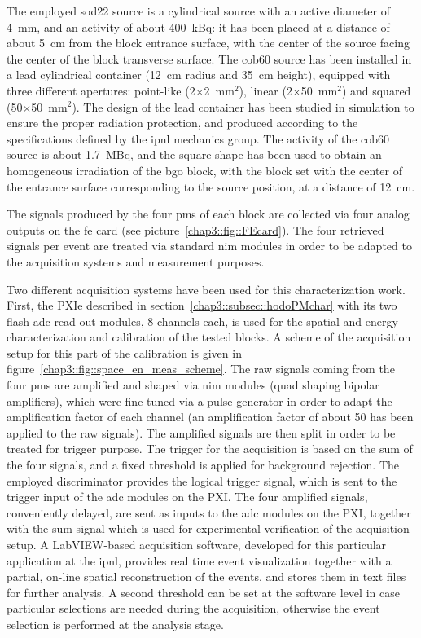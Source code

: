 The employed \gls{sod22} source is a cylindrical source with an active diameter of 4~mm, and an activity of about 400~kBq: it has been placed at a distance of about 5~cm from the block entrance surface, with the center of the source facing the center of the block transverse surface. The \gls{cob60} source has been installed in a lead cylindrical container (12~cm radius and 35~cm height), equipped with three different apertures: point-like (2$\times$2~mm$^2$), linear (2$\times$50~mm$^2$) and squared (50$\times$50~mm$^2$). The design of the lead container has been studied in simulation to ensure the proper radiation protection, and produced according to the specifications defined by the \gls{ipnl} mechanics group. The activity of the \gls{cob60} source is about 1.7~MBq, and the square shape has been used to obtain an homogeneous irradiation of the \gls{bgo} block, with the block set with the center of the entrance surface corresponding to the source position, at a distance of 12~cm.

The signals produced by the four \glspl{pm} of each block are collected via four analog outputs on the \gls{fe} card (see picture~\ref{chap3::fig::FEcard}). The four retrieved signals per event are treated via standard \gls{nim} modules in order to be adapted to the acquisition systems and measurement purposes.

Two different acquisition systems have been used for this characterization work. First, the PXIe described in section~\ref{chap3::subsec::hodoPMchar} with its two flash \gls{adc} read-out modules, 8 channels each, is used for the spatial and energy characterization and calibration of the tested blocks. A scheme of the acquisition setup for this part of the calibration is given in figure~\ref{chap3::fig::space_en_meas_scheme}. The raw signals coming from the four \glspl{pm} are amplified and shaped via \gls{nim} modules (quad shaping bipolar amplifiers), which were fine-tuned via a pulse generator in order to adapt the amplification factor of each channel (an amplification factor of about 50 has been applied to the raw signals). The amplified signals are then split in order to be treated for trigger purpose. The trigger for the acquisition is based on the sum of the four signals, and a fixed threshold is applied for background rejection. The employed discriminator provides the logical trigger signal, which is sent to the trigger input of the \gls{adc} modules on the PXI. The four amplified signals, conveniently delayed, are sent as inputs to the \gls{adc} modules on the PXI, together with the sum signal which is used for experimental verification of the acquisition setup. A LabVIEW-based acquisition software, developed for this particular application at the \gls{ipnl}, provides real time event visualization together with a partial, on-line spatial reconstruction of the events, and stores them in text files for further analysis. A second threshold can be set at the software level in case particular selections are needed during the acquisition, otherwise the event selection is performed at the analysis stage. 


